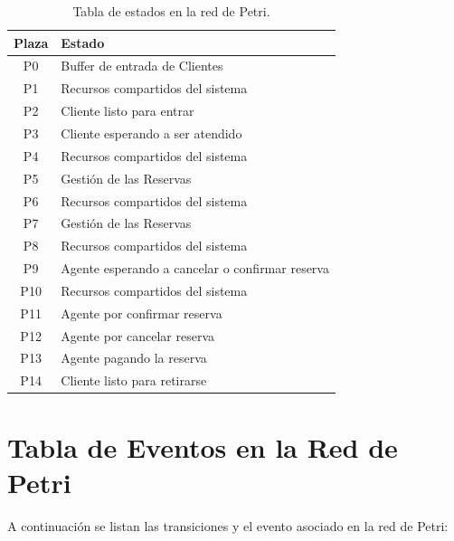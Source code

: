 \documentclass[12pt]{article}
\begin{document}
\begin{table}[H]
    \centering
    \renewcommand{\arraystretch}{1.2}
    \begin{tabularx}{\textwidth}{|c|X|}
    \hline
    \rowcolor{gray!20}
    \textbf{Plaza} & \textbf{Estado} \\ \hline
    P0  & Buffer de entrada de Clientes               \\ \hline
    P1  & Recursos compartidos del sistema            \\ \hline
    P2  & Cliente listo para entrar                   \\ \hline
    P3  & Cliente esperando a ser atendido            \\ \hline
    P4  & Recursos compartidos del sistema            \\ \hline
    P5  & Gestión de las Reservas                     \\ \hline
    P6  & Recursos compartidos del sistema            \\ \hline
    P7  & Gestión de las Reservas                     \\ \hline
    P8  & Recursos compartidos del sistema            \\ \hline
    P9  & Agente esperando a cancelar o confirmar reserva   \\ \hline
    P10 & Recursos compartidos del sistema            \\ \hline
    P11 & Agente por confirmar reserva                \\ \hline
    P12 & Agente por cancelar reserva                 \\ \hline
    P13 & Agente pagando la reserva                   \\ \hline
    P14 & Cliente listo para retirarse                \\ \hline
    \end{tabularx}
    \caption{Tabla de estados en la red de Petri.}
    \label{tabla:estados-red-petri}
\end{table}

\section{Tabla de Eventos en la Red de Petri}
A continuación se listan las transiciones y el evento asociado en la red de Petri:
\end{document}
